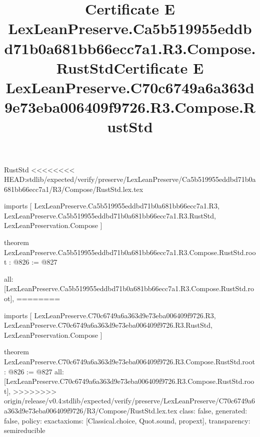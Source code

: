 \begin{lexlean}{RustStd}
<<<<<<<< HEAD:stdlib/expected/verify/preserve/LexLeanPreserve/Ca5b519955eddbd71b0a681bb66ecc7a1/R3/Compose/RustStd.lex.tex
\title{Certificate E LexLeanPreserve.Ca5b519955eddbd71b0a681bb66ecc7a1.R3.Compose.RustStd}
\begin{coremodule}
imports [
  LexLeanPreserve.Ca5b519955eddbd71b0a681bb66ecc7a1.R3,
  LexLeanPreserve.Ca5b519955eddbd71b0a681bb66ecc7a1.R3.RustStd,
  LexLeanPreservation.Compose
]

theorem LexLeanPreserve.Ca5b519955eddbd71b0a681bb66ecc7a1.R3.Compose.RustStd.root : @826 := @827 {
  all: [LexLeanPreserve.Ca5b519955eddbd71b0a681bb66ecc7a1.R3.Compose.RustStd.root],
========
\title{Certificate E LexLeanPreserve.C70c6749a6a363d9e73eba006409f9726.R3.Compose.RustStd}
\begin{coremodule}
imports [
  LexLeanPreserve.C70c6749a6a363d9e73eba006409f9726.R3,
  LexLeanPreserve.C70c6749a6a363d9e73eba006409f9726.R3.RustStd,
  LexLeanPreservation.Compose
]

theorem LexLeanPreserve.C70c6749a6a363d9e73eba006409f9726.R3.Compose.RustStd.root : @826 := @827 {
  all: [LexLeanPreserve.C70c6749a6a363d9e73eba006409f9726.R3.Compose.RustStd.root],
>>>>>>>> origin/release/v0.4:stdlib/expected/verify/preserve/LexLeanPreserve/C70c6749a6a363d9e73eba006409f9726/R3/Compose/RustStd.lex.tex
  class: false,
  generated: false,
  policy: exact{axioms: [Classical.choice, Quot.sound, propext]},
  transparency: semireducible
}


\end{coremodule}}
\end{coremodule}
\end{lexlean}
